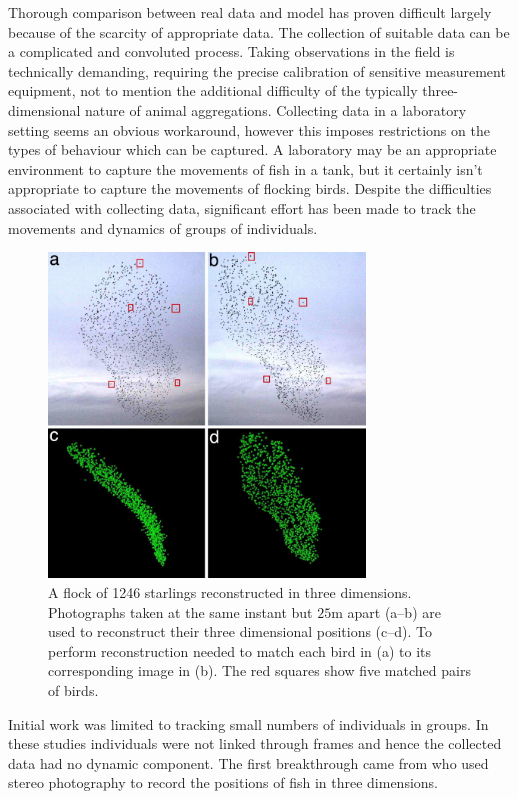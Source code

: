 Thorough comparison between real data and model has proven difficult largely because of the scarcity of appropriate data. The collection of suitable data can be a complicated and convoluted process. Taking observations in the field is technically demanding, requiring the precise calibration of sensitive measurement equipment, not to mention the additional difficulty of the typically three-dimensional nature of animal aggregations. Collecting data in a laboratory setting seems an obvious workaround, however this imposes restrictions on the types of behaviour which can be captured. A laboratory may be an appropriate environment to capture the movements of fish in a tank, but it certainly isn't appropriate to capture the movements of flocking birds. Despite the difficulties associated with collecting data, significant effort has been made to track the movements and dynamics of groups of individuals.

\begin{figure}[t]
	\includegraphics[width=0.75\textwidth]{ballerini_starlings.jpg}
	\caption{A flock of 1246 starlings reconstructed in three dimensions. Photographs taken at the same instant but $25$m apart (a--b) are used to reconstruct their three dimensional positions (c--d). To perform reconstruction \textcite{ballerini08} needed to match each bird in (a) to its corresponding image in (b). The red squares show five matched pairs of birds.}
	\label{fig:ballerini}
\end{figure}

Initial work was limited to tracking small numbers of individuals in groups. In these studies individuals were not linked through frames and hence the collected data had no dynamic component. The first breakthrough came from \textcite{cullen65} who used stereo photography to record the positions of fish in three dimensions.

